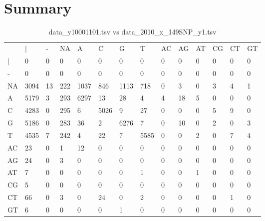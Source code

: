\section{Summary} \label{section_summary}
\begin{center}
\begin{longtable}{|l|l|l|l|l|l|l|l|l|l|l|l|l|l|}
\caption{data\_y10001101.tsv vs data\_2010\_x\_149SNP\_y1.tsv} \label{table_dm0}\\
\hline
\\
\hline
&$|$&-&NA&A&C&G&T&AC&AG&AT&CG&CT&GT\\
$|$&0&0&0&0&0&0&0&0&0&0&0&0&0\\
-&0&0&0&0&0&0&0&0&0&0&0&0&0\\
NA&3094&13&222&1037&846&1113&718&0&3&0&3&4&1\\
A&5179&3&293&6297&13&28&4&4&18&5&0&0&0\\
C&4283&0&295&6&5026&9&27&0&0&0&5&9&0\\
G&5186&0&283&36&2&6276&7&0&10&0&2&0&3\\
T&4535&7&242&4&22&7&5585&0&0&2&0&7&4\\
AC&23&0&1&12&0&0&0&0&0&0&0&0&0\\
AG&24&0&3&0&0&0&0&0&0&0&0&0&0\\
AT&7&0&0&0&0&0&1&0&0&1&0&0&0\\
CG&5&0&0&0&0&0&0&0&0&0&0&0&0\\
CT&66&0&3&0&24&0&2&0&0&0&0&1&0\\
GT&6&0&0&0&0&1&0&0&0&0&0&0&0\\
\hline
\end{longtable}
\end{center}

